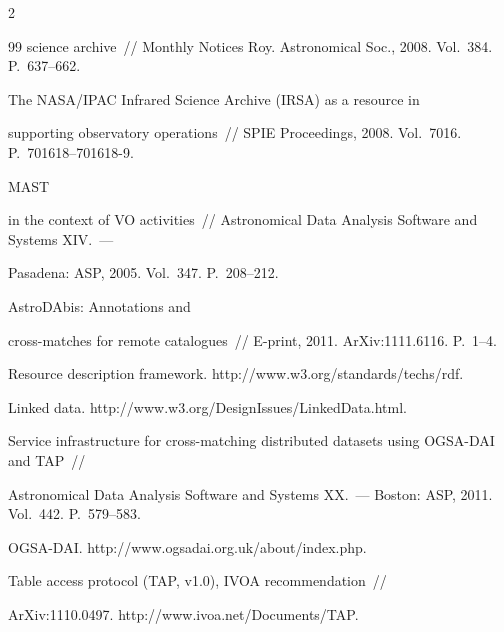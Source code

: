 \begin{multicols}{2}
{{\begin{thebibliography}{99}
science archive~// Monthly Notices Roy. Astronomical Soc., 2008. Vol.~384. P.~637--662.


 The NASA/IPAC Infrared Science Archive (IRSA) as a resource in 

supporting observatory operations~//  SPIE Proceedings, 2008. Vol.~7016. P.~701618--701618-9.


 MAST 

in the context of VO activities~// Astronomical Data Analysis Software and Systems XIV.~--- 

Pasadena: ASP, 2005. Vol.~347. P.~208--212.



AstroDAbis: Annotations and 

cross-matches for remote catalogues~// E-print, 2011. ArXiv:1111.6116. P.~1--4. 


Resource description framework. {\sf http://www.w3.org/\linebreak standards/techs/rdf}.


Linked data. {\sf http://www.w3.org/DesignIssues/\linebreak LinkedData.html}.



Service infrastructure for cross-matching distributed datasets using OGSA-DAI and TAP~// 

Astronomical Data Analysis Software and Systems XX.~--- Boston: ASP, 2011. Vol.~442. P.~579--583.


 OGSA-DAI. {\sf http://www.ogsadai.org.uk/about/\linebreak index.php}.


 Table access protocol (TAP, v1.0), IVOA recommendation~// 

ArXiv:1110.0497. {\sf http://www.ivoa.net/Documents/TAP}. 


\end{thebibliography}}}
\end{multicols}
